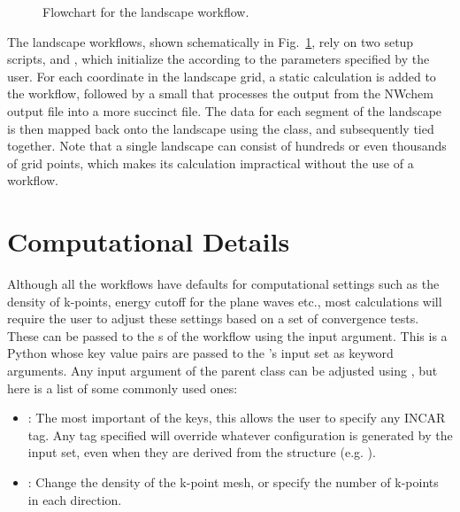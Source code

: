 \begin{refsection}
\begin{figure}[ht] 
 
\caption{Flowchart for the landscape workflow.} 
\label{automation:fig-landscape} 
\end{figure} 

The landscape workflows, shown schematically in Fig.~\ref{automation:fig-landscape}, 
rely on two setup scripts,  and , which 
initialize the  according to the parameters specified by the 
user. For each coordinate in the landscape grid, a static calculation is added 
to the workflow, followed by a small  that processes the output 
from the NWchem output file into a more succinct  file. The data for
each segment of the landscape is then mapped back onto the landscape using the 
 class, and subsequently tied together. Note that a single 
landscape can consist of hundreds or even thousands of grid points, which makes 
its calculation impractical without the use of a workflow.
 
\section{Computational Details} \label{automation:sec-computational}
 
Although all the workflows have defaults for computational settings such as 
the density of k-points, energy cutoff for the plane waves etc., most 
calculations will require the user to adjust these settings based on a set of 
convergence tests. These can be passed to the s of the workflow 
using the  input argument. This is a Python  
whose key value pairs are passed to the 
's input 
set as keyword arguments. Any input argument of the parent  
class can be adjusted using , but here is a list of 
some commonly used ones: 
 
\begin{itemize} 
 
\item {}: The most important of the keys, this 
allows the user to specify any INCAR tag. Any tag specified will override 
whatever configuration is generated by the input set, even when they are 
derived from the structure (e.g. ). 
 
\item {}: Change the density of the k-point mesh, 
or specify the number of k-points in each direction. 
 

\end{itemize}
\end{refsection}
